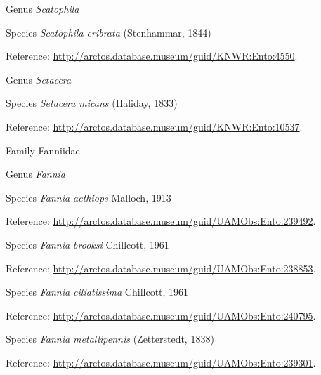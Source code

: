 \documentclass[9pt, article]{memoir}
\begin{document}
\begin{multicols}{2}
\vspace{6pt}\noindent\hspace{30pt}Genus \textit{Scatophila}


\vspace{6pt}\noindent\hspace{36pt}Species \textit{Scatophila cribrata} (Stenhammar, 1844)


Reference: 
\url{http://arctos.database.museum/guid/KNWR:Ento:4550}.

\vspace{6pt}\noindent\hspace{30pt}Genus \textit{Setacera}


\vspace{6pt}\noindent\hspace{36pt}Species \textit{Setacera micans} (Haliday, 1833)


Reference: 
\url{http://arctos.database.museum/guid/KNWR:Ento:10537}.

\vspace{6pt}\noindent\hspace{24pt}Family Fanniidae


\vspace{6pt}\noindent\hspace{30pt}Genus \textit{Fannia}


\vspace{6pt}\noindent\hspace{36pt}Species \textit{Fannia aethiops} Malloch, 1913


Reference: 
\url{http://arctos.database.museum/guid/UAMObs:Ento:239492}.

\vspace{6pt}\noindent\hspace{36pt}Species \textit{Fannia brooksi} Chillcott, 1961


Reference: 
\url{http://arctos.database.museum/guid/UAMObs:Ento:238853}.

\vspace{6pt}\noindent\hspace{36pt}Species \textit{Fannia ciliatissima} Chillcott, 1961


Reference: 
\url{http://arctos.database.museum/guid/UAMObs:Ento:240795}.

\vspace{6pt}\noindent\hspace{36pt}Species \textit{Fannia metallipennis} (Zetterstedt, 1838)


Reference: 
\url{http://arctos.database.museum/guid/UAMObs:Ento:239301}.


\end{multicols}
\end{document}
